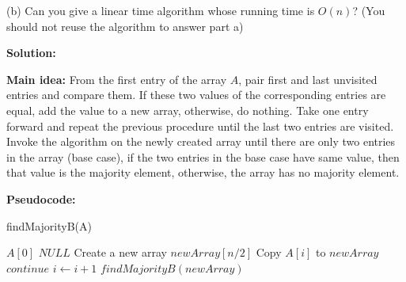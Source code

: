 \documentclass{article}
\begin{document}
\vspace{0.3in}
\par(b) Can you give a linear time algorithm whose running time is $O(n)$? (You should not reuse the algorithm to answer part a)
{\color{blue}
\par\textbf{Solution: }
\par\textbf{Main idea: }From the first entry of the array $A$, pair first and last unvisited entries and compare them. If these two values of the corresponding entries are equal, add the value to a new array, otherwise, do nothing. Take one entry forward and repeat the previous procedure until the last two entries are visited. Invoke the algorithm on the newly created array until there are only two entries in the array (base case), if the two entries in the base case have same value, then that value is the majority element, otherwise, the array has no majority element.\\

\par\textbf{Pseudocode: }
\begin{algorithm}
	\caption{findMajorityB(A)}
	\label{alg2}
	\color{blue}
	\begin{algorithmic}
				\RETURN $A[0]$
			\ELSE
				\RETURN $NULL$
			\ENDIF
		\ENDIF
		\STATE Create a new array $newArray[n/2]$
				\STATE Copy $A[i]$ to $newArray$
			\ELSE
				\STATE $continue$
			\ENDIF
		\STATE $i \gets i + 1$
		\ENDWHILE
		\RETURN $findMajorityB(newArray)$
	\end{algorithmic}
\end{algorithm}

}
\end{document}
